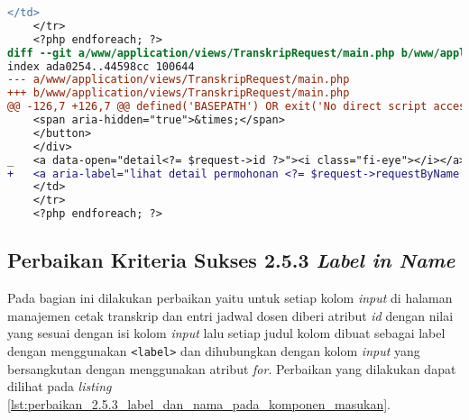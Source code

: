 \begin{lstlisting}[frame=single, label={lst:perbaikan_2.4.4_tautan_tanpa_keterangan}, language=diff, caption=Perbaikan Kriteria Sukses 2.4.4]
    </td>
    </tr>
    <?php endforeach; ?>
diff --git a/www/application/views/TranskripRequest/main.php b/www/application/views/TranskripRequest/main.php
index ada0254..44598cc 100644
--- a/www/application/views/TranskripRequest/main.php
+++ b/www/application/views/TranskripRequest/main.php
@@ -126,7 +126,7 @@ defined('BASEPATH') OR exit('No direct script access allowed');
    <span aria-hidden="true">&times;</span>
    </button>
    </div>
_   <a data-open="detail<?= $request->id ?>"><i class="fi-eye"></i></a>
+   <a aria-label="lihat detail permohonan <?= $request->requestByName ?>" data-open="detail<?= $request->id ?>"><i class="fi-eye"></i></a>
    </td>
    </tr>
    <?php endforeach; ?>
\end{lstlisting}

\subsection{Perbaikan Kriteria Sukses 2.5.3 \textit{Label in Name}}
\label{subsec:perbaikan_kriteria_sukses_2.5.3}
Pada bagian ini dilakukan perbaikan yaitu untuk setiap kolom \textit{input} di halaman manajemen cetak transkrip dan entri jadwal dosen diberi atribut \textit{id} dengan nilai yang sesuai dengan isi kolom \textit{input} lalu setiap judul kolom dibuat sebagai label dengan menggunakan \texttt{<label>} dan dihubungkan dengan kolom \textit{input} yang bersangkutan dengan menggunakan atribut \textit{for}. Perbaikan yang dilakukan dapat dilihat pada \textit{listing} \ref{lst:perbaikan_2.5.3_label_dan_nama_pada_komponen_masukan}.

